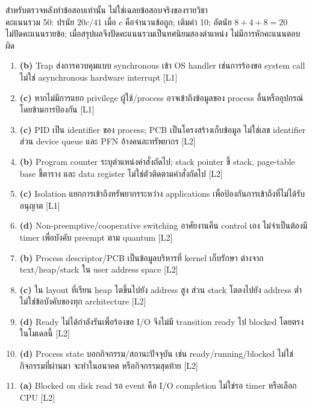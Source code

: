 \noindent สำหรับตรวจหลังทำข้อสอบเท่านั้น ไม่ใช่เฉลยข้อสอบจริงของรายวิชา\\คะแนนรวม 50: ปรนัย $20c/41$ เมื่อ $c$ คือจำนวนข้อถูก; เติมคำ 10; อัตนัย $8+4+8=20$\\ไม่ปัดคะแนนรายข้อ; เมื่อสรุปผลจึงปัดคะแนนรวมเป็นทศนิยมสองตำแหน่ง ไม่มีการหักคะแนนตอบผิด\par\medskip
{}
\begin{enumerate}[leftmargin=1.4em,start=1,itemsep=0.18cm]
\item \textbf{(b)} Trap ส่งการควบคุมแบบ synchronous เข้า OS handler เช่นการร้องขอ system call ไม่ใช่ asynchronous hardware interrupt {\small [L1]}
\item \textbf{(c)} หากไม่มีการแยก privilege ผู้ใช้/process อาจเข้าถึงข้อมูลของ process อื่นหรืออุปกรณ์โดยข้ามการป้องกัน {\small [L1]}
\item \textbf{(c)} PID เป็น identifier ของ process; PCB เป็นโครงสร้างเก็บข้อมูล ไม่ใช่เลข identifier ส่วน device queue และ PFN อ้างคนละทรัพยากร {\small [L2]}
\item \textbf{(b)} Program counter ระบุตำแหน่งคำสั่งถัดไป; stack pointer ชี้ stack, page-table base ชี้ตาราง และ data register ไม่ใช่ตัวติดตามคำสั่งถัดไป {\small [L2]}
\item \textbf{(c)} Isolation แยกการเข้าถึงทรัพยากรระหว่าง applications เพื่อป้องกันการเข้าถึงที่ไม่ได้รับอนุญาต {\small [L1]}
\item \textbf{(d)} Non-preemptive/cooperative switching อาศัยงานคืน control เอง ไม่จำเป็นต้องมี timer เพื่อบังคับ preempt ตาม quantum {\small [L2]}
\item \textbf{(b)} Process descriptor/PCB เป็นข้อมูลบริหารที่ kernel เก็บรักษา ต่างจาก text/heap/stack ใน user address space {\small [L2]}
\item \textbf{(c)} ใน layout ที่เรียน heap โตขึ้นไปยัง address สูง ส่วน stack โตลงไปยัง address ต่ำ ไม่ใช่ข้อบังคับของทุก architecture {\small [L2]}
\item \textbf{(d)} Ready ไม่ได้กำลังรันเพื่อร้องขอ I/O จึงไม่มี transition ready ไป blocked โดยตรงในโมเดลนี้ {\small [L2]}
\item \textbf{(d)} Process state บอกกิจกรรม/สถานะปัจจุบัน เช่น ready/running/blocked ไม่ใช่กิจกรรมที่ผ่านมา จะทำในอนาคต หรือกิจกรรมสุดท้าย {\small [L2]}
\item \textbf{(a)} Blocked on disk read รอ event คือ I/O completion ไม่ใช่รอ timer หรือเลือก CPU {\small [L2]}
\end{enumerate}
